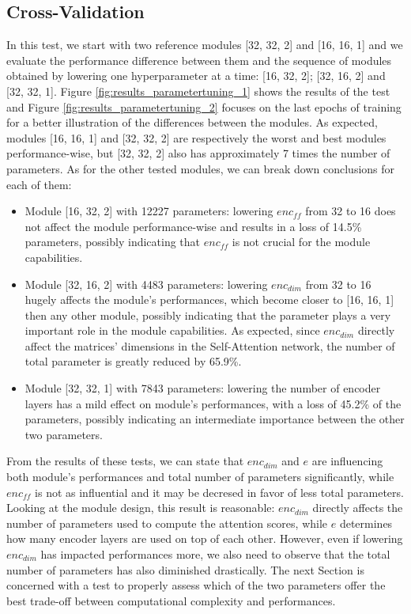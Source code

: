         \subsection{Cross-Validation}
            In this test, we start with two reference modules [32, 32, 2] and [16, 16, 1] and we evaluate the performance difference between them and the sequence of modules obtained by lowering one hyperparameter at a time: [16, 32, 2]; [32, 16, 2] and [32, 32, 1]. Figure \ref{fig:results_parametertuning_1} shows the results of the test and Figure \ref{fig:results_parametertuning_2} focuses on the last epochs of training for a better illustration of the differences between the modules. \newline
            As expected, modules [16, 16, 1] and [32, 32, 2] are respectively the worst and best modules performance-wise, but [32, 32, 2] also has approximately 7 times the number of parameters. As for the other tested modules, we can break down conclusions for each of them:
            \begin{itemize}
                \item Module [16, 32, 2] with 12227 parameters: lowering $enc_{ff}$ from 32 to 16 does not affect the module performance-wise and results in a loss of 14.5\% parameters, possibly indicating that $enc_{ff}$ is not crucial for the module capabilities.
                \item Module [32, 16, 2] with 4483 parameters: lowering $enc_{dim}$ from 32 to 16 hugely affects the module's performances, which become closer to [16, 16, 1] then any other module, possibly indicating that the parameter plays a very important role in the module capabilities. As expected, since $enc_{dim}$ directly affect the matrices' dimensions in the Self-Attention network, the number of total parameter is greatly reduced by 65.9\%.
                \item Module [32, 32, 1] with 7843 parameters: lowering the number of encoder layers has a mild effect on module's performances, with a loss of 45.2\% of the parameters, possibly indicating an intermediate importance between the other two parameters.
            \end{itemize}
            \noindent
            From the results of these tests, we can state that $enc_{dim}$ and $e$ are influencing both module's performances and total number of parameters significantly, while $enc_{ff}$ is not as influential and it may be decresed in favor of less total parameters. Looking at the module design, this result is reasonable: $enc_{dim}$ directly affects the number of parameters used to compute the attention scores, while $e$ determines how many encoder layers are used on top of each other. However, even if lowering $enc_{dim}$ has impacted performances more, we also need to observe that the total number of parameters has also diminished drastically. The next Section is concerned with a test to properly assess which of the two parameters offer the best trade-off between computational complexity and performances.
        
